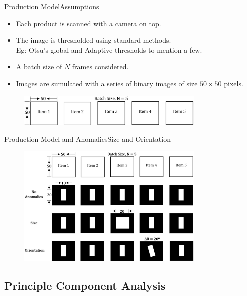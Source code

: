 \documentclass{beamer}
\begin{document}
\begin{frame}{Production Model}{Assumptions}
  \begin{itemize}
    \item Each product is scanned with a camera on top.
    \item The image is thresholded using standard methods. \\
    Eg: Otsu's global and Adaptive thresholds to mention a few.
    \item A batch size of $N$ frames considered.
    \item Images are sumulated with a series of binary images of size $50\times50$ pixels.
  \end{itemize}
  \begin{figure}
    \includegraphics[width=0.8\textwidth]{model}
  \end{figure}
\end{frame}

\begin{frame}{Production Model and Anomalies}{Size and Orientation}
  \begin{figure}
    \includegraphics[width=0.8\textwidth]{anomalies_model}
  \end{figure}
\end{frame}

\subsection{Principle Component Analysis}
\end{document}
